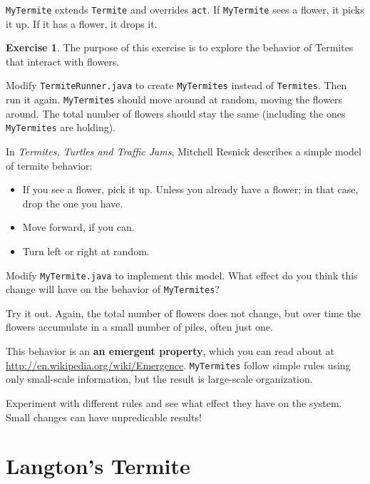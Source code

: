 \documentclass[12pt]{book}
\theoremstyle{definition}
\newtheorem{excz}{Exercise}[chapter]
\newenvironment{exercise}{\bigskip\begin{excz}\mbox{}}{\end{excz}}
\begin{document}
{\tt MyTermite} extends {\tt Termite} and overrides {\tt act}.
If {\tt MyTermite} sees a flower, it picks it up.  If it has
a flower, it drops it.

\begin{exercise}
The purpose of this exercise is to explore the behavior of Termites
that interact with flowers.

Modify {\tt TermiteRunner.java} to create {\tt MyTermites} instead
of {\tt Termites}.  Then run it again.  {\tt MyTermites} should move
around at random, moving the flowers around.  The total number of
flowers should stay the same (including the ones {\tt MyTermites}
are holding).

In {\em Termites, Turtles and Traffic Jams}, Mitchell Resnick describes
a simple model of termite behavior:

\begin{itemize}

\item If you see a flower, pick it up.  Unless you already have
a flower; in that case, drop the one you have.

\item Move forward, if you can.

\item Turn left or right at random.

\end{itemize}

Modify {\tt MyTermite.java} to implement this model.  What effect do
you think this change will have on the behavior of {\tt MyTermites}?

Try it out.  Again, the total number of flowers does not change,
but over time the flowers accumulate in a small number of piles, often
just one.

This behavior is an {\bf an emergent property}, which you can read
about at \url{http://en.wikipedia.org/wiki/Emergence}.  {\tt MyTermites}
follow simple rules using only small-scale information, but the result
is large-scale organization.

Experiment with different rules and see what effect they have on the
system.  Small changes can have unpredicable results!

\end{exercise}


\section{Langton's Termite}
\end{document}
